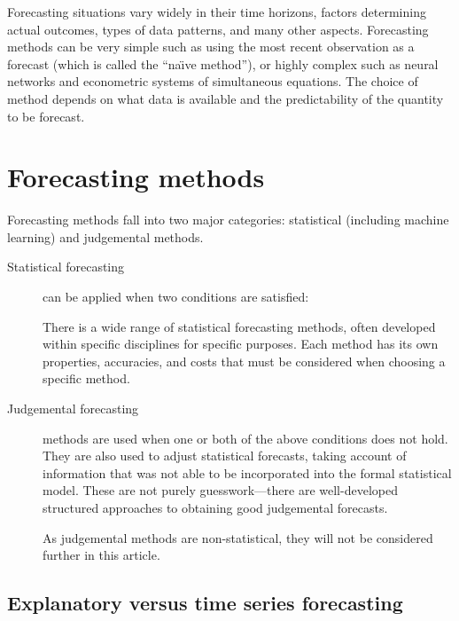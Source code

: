 \documentclass[a4paper,10pt]{article}
\begin{document}
Forecasting situations vary widely in their time horizons, factors determining actual outcomes, types of data patterns, and many other aspects. Forecasting methods can be very simple such as using the most recent observation as a forecast (which is called the ``na\"{\i}ve method''), or highly complex such as neural networks and econometric systems of simultaneous equations. The choice of method depends on what data is available and the predictability of the quantity to be forecast.

\section{Forecasting methods}

Forecasting methods fall into two major categories: statistical (including machine learning) and judgemental methods.
\begin{description}
  \item[Statistical forecasting] can be applied when two conditions are satisfied:
    There is a wide range of statistical forecasting methods, often developed within specific disciplines for specific purposes. Each method has its own properties, accuracies, and costs that must be considered when choosing a specific method.

  \item[Judgemental forecasting] methods are used when one or both of the above conditions does not hold. They are also used to adjust statistical forecasts, taking account of information that was not able to be incorporated into the formal statistical model. These are not purely guesswork---there are well-developed structured approaches to obtaining good judgemental forecasts.

    As judgemental methods are non-statistical, they will not be considered further in this article.
\end{description}

\subsection*{Explanatory versus time series forecasting}
\end{document}
